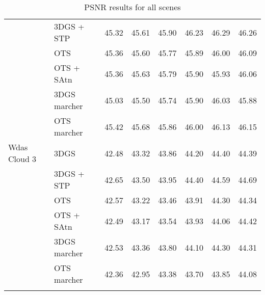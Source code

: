 \begin{longtable}[H]{llrrrrrr}
 & 3DGS + STP & 45.32 & 45.61 & 45.90 & 46.23 & 46.29 & 46.26 \\
 & OTS & 45.36 & 45.60 & 45.77 & 45.89 & 46.00 & 46.09 \\
 & OTS + SAtn & 45.36 & 45.63 & 45.79 & 45.90 & 45.93 & 46.06 \\
 & 3DGS marcher & 45.03 & 45.50 & 45.74 & 45.90 & 46.03 & 45.88 \\
 & OTS marcher & 45.42 & 45.68 & 45.86 & 46.00 & 46.13 & 46.15 \\
Wdas Cloud 3 & 3DGS & 42.48 & 43.32 & 43.86 & 44.20 & 44.40 & 44.39 \\
 & 3DGS + STP & 42.65 & 43.50 & 43.95 & 44.40 & 44.59 & 44.69 \\
 & OTS & 42.57 & 43.22 & 43.46 & 43.91 & 44.30 & 44.34 \\
 & OTS + SAtn & 42.49 & 43.17 & 43.54 & 43.93 & 44.06 & 44.42 \\
 & 3DGS marcher & 42.53 & 43.36 & 43.80 & 44.10 & 44.30 & 44.31 \\
 & OTS marcher & 42.36 & 42.95 & 43.38 & 43.70 & 43.85 & 44.08 \\
\bottomrule
\caption{PSNR results for all scenes}
\end{longtable}
